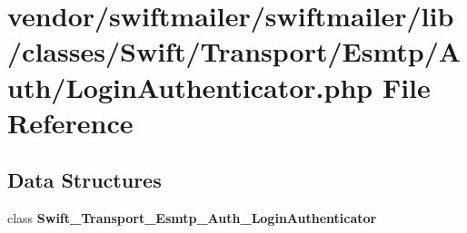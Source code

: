 \section{vendor/swiftmailer/swiftmailer/lib/classes/\+Swift/\+Transport/\+Esmtp/\+Auth/\+Login\+Authenticator.php File Reference}
\label{_login_authenticator_8php}
\subsection*{Data Structures}
\begin{DoxyCompactItemize}
\item 
class {\bf Swift\+\_\+\+Transport\+\_\+\+Esmtp\+\_\+\+Auth\+\_\+\+Login\+Authenticator}
\end{DoxyCompactItemize}
